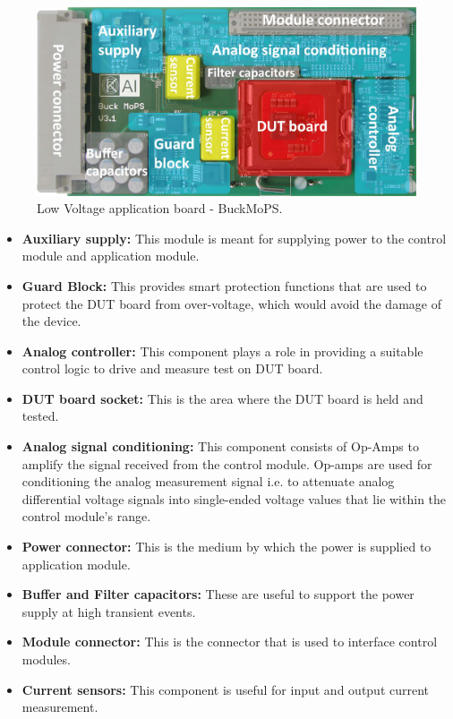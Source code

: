 \begin{figure}[htb]
		\centering
		\includegraphics[trim=0 0 0 0, clip, width=\textwidth]{images/Buck_MoPS3.jpg}
		\caption{Low Voltage application board - BuckMoPS.}
		\label{fig:DUT}
\end{figure}

\begin{itemize}[label={}]
\item \textbf{Auxiliary supply:} This module is meant for supplying power to the control module and application module. 
\item \textbf{Guard Block:} This provides smart protection functions that are used to protect the DUT board from over-voltage, which would avoid the damage of the device.
\item \textbf{Analog controller:} This component plays a role in providing a suitable control logic to drive and measure test on DUT board.
\item \textbf{DUT board socket:} This is the area where the DUT board is held and tested.
\item \textbf{Analog signal conditioning:} This component consists of Op-Amps to amplify the signal received from the control module. 
Op-amps are used for conditioning the analog measurement signal i.e. to attenuate analog differential voltage signals into single-ended voltage values that lie within the control module's range. 
\item \textbf{Power connector:} This is the medium by which the power is supplied to application module.
\item \textbf{Buffer and Filter capacitors:} These are useful to support the power supply at high transient events.
\item \textbf{Module connector:} This is the connector that is used to interface control modules.
\item \textbf{Current sensors:} This component is useful for input and output current measurement. 
\end{itemize}

